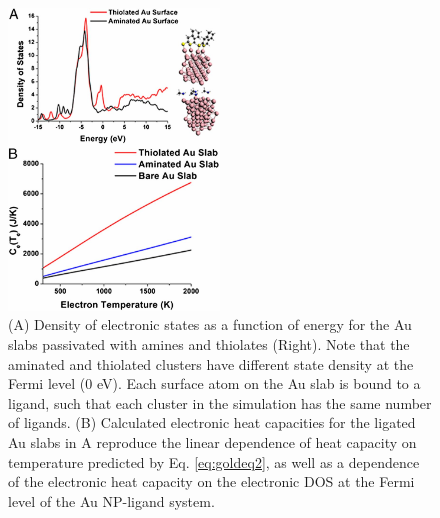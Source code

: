 \begin{figure}
\begin{center}
\includegraphics[width=0.5\textwidth]{./Chapter2/gold3.jpg}
\caption[Electronic structure calculations on Au-ligand model systems.]{(A) Density of electronic states as a function of energy for the Au slabs passivated with amines and thiolates (Right). Note that the aminated and thiolated clusters have different state density at the Fermi level (0 eV). Each surface atom on the Au slab is bound to a ligand, such that each cluster in the simulation has the same number of ligands. (B) Calculated electronic heat capacities for the ligated Au slabs in A reproduce the linear dependence of heat capacity on temperature predicted by Eq. \ref{eq:goldeq2}, as well as a dependence of the electronic heat capacity on the electronic DOS at the Fermi level of the Au NP-ligand system.}
\label{f:gold3}
\end{center}
\end{figure}

